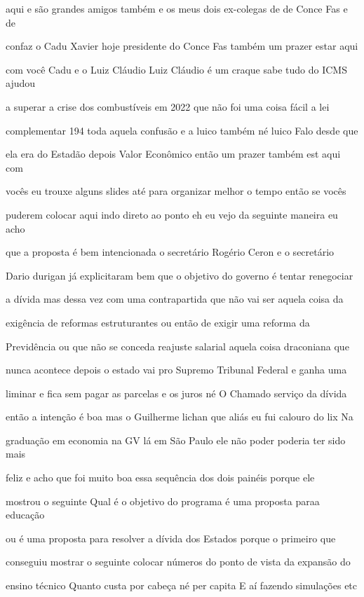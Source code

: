 \documentclass[a4paper,12pt]{article}
\begin{document}
aqui e são grandes amigos também e os meus dois ex-colegas de de Conce Fas e de

confaz o Cadu Xavier hoje presidente do Conce Fas também um prazer estar aqui

com você Cadu e o Luiz Cláudio Luiz Cláudio é um craque sabe tudo do ICMS ajudou

a superar a crise dos combustíveis em 2022 que não foi uma coisa fácil a lei

complementar 194 toda aquela confusão e a luico também né luico Falo desde que

ela era do Estadão depois Valor Econômico então um prazer também est aqui com

vocês eu trouxe alguns slides até para organizar melhor o tempo então se vocês

puderem colocar aqui indo direto ao ponto eh eu vejo da seguinte maneira eu acho

que a proposta é bem intencionada o secretário Rogério Ceron e o secretário

Dario durigan já explicitaram bem que o objetivo do governo é tentar renegociar

a dívida mas dessa vez com uma contrapartida que não vai ser aquela coisa da

exigência de reformas estruturantes ou então de exigir uma reforma da

Previdência ou que não se conceda reajuste salarial aquela coisa draconiana que

nunca acontece depois o estado vai pro Supremo Tribunal Federal e ganha uma

liminar e fica sem pagar as parcelas e os juros né O Chamado serviço da dívida

então a intenção é boa mas o Guilherme lichan que aliás eu fui calouro do lix Na

graduação em economia na GV lá em São Paulo ele não poder poderia ter sido mais

feliz e acho que foi muito boa essa sequência dos dois painéis porque ele

mostrou o seguinte Qual é o objetivo do programa é uma proposta paraa educação

ou é uma proposta para resolver a dívida dos Estados porque o primeiro que

conseguiu mostrar o seguinte colocar números do ponto de vista da expansão do

ensino técnico Quanto custa por cabeça né per capita E aí fazendo simulações etc
\end{document}
